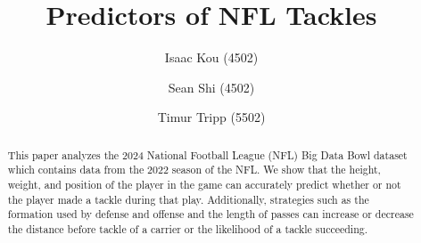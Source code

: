 \documentclass[bibtex, sigconf, hyperref={colorlinks=true,linkcolor=blue,urlcolor=blue}]{acmart}
\begin{document}
\title{Predictors of NFL Tackles}

\author{Isaac Kou (4502)}

\author{Sean Shi (4502)}

\author{Timur Tripp (5502)}



\renewcommand{\shortauthors}{Kou et al.}


\begin{abstract}
This paper analyzes the 2024 National Football League (NFL) Big Data Bowl dataset
which contains data from the 2022 season of the NFL.
We show that the height, weight, and position of the player in the game can
accurately predict whether or not the player made a tackle during that play.
Additionally, strategies such as the formation used by defense and offense
and the length of passes can increase or decrease the distance before tackle of
a carrier or the likelihood of a tackle succeeding.
\end{abstract}
\end{document}
